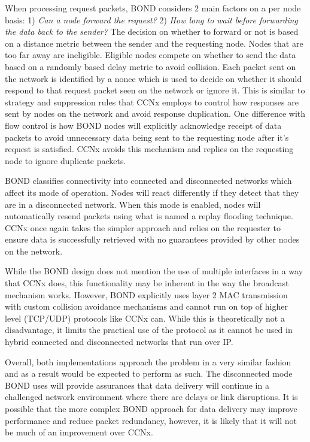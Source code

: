 \documentclass[a4paper,12pt]{report}      %
\begin{document}
\begin{descripton}
When processing request packets, BOND considers 2 main factors on a per node basis: 1) \textit{Can a
node forward the request?} 2) \textit{How long to wait before forwarding the data back to the sender?} The
decision on whether to forward or not is based on a distance metric between the sender and the
requesting node. Nodes that are too far away are ineligible. Eligible nodes compete on whether to send
the data based on a randomly based delay metric to avoid collision. Each packet sent on the network is
identified by a nonce which is used to decide on whether it should respond to that request packet seen
on the network or ignore it. This is similar to strategy and suppression rules that CCNx employs to
control how responses are sent by nodes on the network and avoid response duplication. One difference
with flow control is how BOND nodes will explicitly acknowledge receipt of data packets to avoid
unnecessary data being sent to the requesting node after it's request is satisfied. CCNx avoids this
mechanism and replies on the requesting node to ignore duplicate packets.

BOND classifies connectivity into connected and disconnected networks which affect its mode
of operation. Nodes will react differently if they detect that they are in a disconnected network. When
this mode is enabled, nodes will automatically resend packets using what is named a replay flooding
technique. CCNx once again takes the simpler approach and relies on the requester to ensure data is
successfully retrieved with no guarantees provided by other nodes on the network.

While the BOND design does not mention the use of multiple interfaces in a way that CCNx
does, this functionality may be inherent in the way the broadcast mechanism works. However, BOND
explicitly uses layer 2 MAC transmission with custom collision avoidance mechanisms and cannot run
on top of higher level (TCP/UDP) protocols like CCNx can. While this is theoretically not a
disadvantage, it limits the practical use of the protocol as it cannot be used in hybrid connected and
disconnected networks that run over IP.

Overall, both implementations approach the problem in a very similar fashion and as a result
would be expected to perform as such. The disconnected mode BOND uses will provide assurances
that data delivery will continue in a challenged network environment where there are delays or link
disruptions. It is possible that the more complex BOND approach for data delivery may improve
performance and reduce packet redundancy, however, it is likely that it will not be much of an
improvement over CCNx.


\end{descripton}
\end{document}
